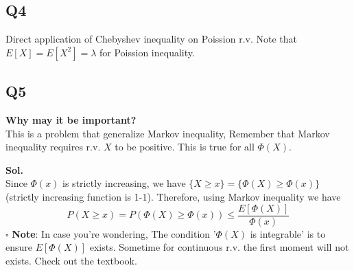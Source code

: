 \documentclass[12pt]{article}
\begin{document}
\subsection*{Q4}
Direct application of Chebyshev inequality on Poission r.v. 
Note that \(E[X] = E[X^2] = \lambda \) for Poission inequality. 

\subsection*{Q5}
\textbf{Why may it be important?}\\ 
This is a problem that generalize Markov inequality, 
Remember that Markov inequality requires r.v. \(X\) to be positive. This is true for all \(\Phi(X)\). 

\textbf{Sol.} \\
Since \(\Phi(x)\) is strictly increasing, we have \(\{X \geq  x\} = \{\Phi(X) \geq  \Phi(x)\}\) (strictly increasing function is 1-1). 
Therefore, using Markov inequality we have 
\[
    P(X \geq  x) = P(\Phi(X) \geq  \Phi(x)) \leq \frac{E[\Phi(X)]}{\Phi(x)}
\]
\hspace{\textwidth}\(\square\) 
\textbf{Note}: In case you're wondering, The condition '\(\Phi(X)\) is integrable' is to ensure \(E[\Phi(X)]\) exists. 
Sometime for continuous r.v. the first moment will not exists. Check out the textbook. 
\end{document}
